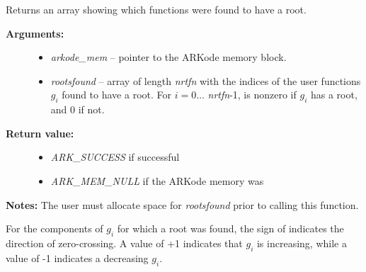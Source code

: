 \documentclass[letterpaper,10pt,english]{sphinxmanual}
\begin{document}

\begin{fulllineitems}
\label{c_interface/User_callable:c.ARKodeGetRootInfo}
Returns an array showing which functions were found to
have a root.
\begin{description}
\item[{\textbf{Arguments:}}] \leavevmode\begin{itemize}
\item {} 
\emph{arkode\_mem} -- pointer to the ARKode memory block.

\item {} 
\emph{rootsfound} -- array of length \emph{nrtfn} with the indices of the
user functions \(g_i\) found to have a root.  For
\(i = 0 \ldots\) \emph{nrtfn}-1,  is nonzero
if \(g_i\) has a root, and 0 if not.

\end{itemize}

\item[{\textbf{Return value:}}] \leavevmode\begin{itemize}
\item {} 
\emph{ARK\_SUCCESS} if successful

\item {} 
\emph{ARK\_MEM\_NULL} if the ARKode memory was 

\end{itemize}

\end{description}

\textbf{Notes:} The user must allocate space for \emph{rootsfound} prior to
calling this function.

For the components of \(g_i\) for which a root was found, the
sign of  indicates the direction of
zero-crossing.  A value of +1 indicates that \(g_i\) is
increasing, while a value of -1 indicates a decreasing \(g_i\).

\end{fulllineitems}

\end{document}
